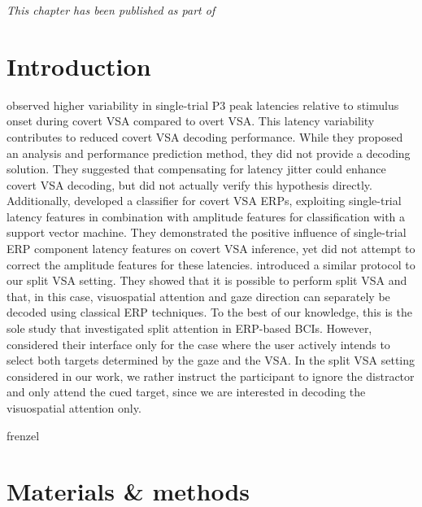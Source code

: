 \label{sec:covert-align}
\emph{This chapter has been published as part of~\textcite{VanDenKerchove2024}}

\section{Introduction}

\textcite{Arico2014} observed higher variability in single-trial P3 peak
latencies relative to stimulus onset during covert VSA compared to overt VSA.
This latency variability contributes to reduced covert VSA decoding performance.
While they proposed an analysis and performance prediction method, they did not provide a
decoding solution.
They suggested that compensating for latency jitter could enhance covert VSA
decoding, but did not actually verify this hypothesis directly.
Additionally, \cite{Hardiansyah2020} developed a classifier for
covert VSA ERPs, exploiting single-trial latency features in combination with
amplitude features for classification with a support vector machine.
They demonstrated the positive influence of single-trial ERP component latency
features on covert VSA inference, yet did not attempt to correct the amplitude
features for these latencies.
\textcite{Frenzel2011} introduced a similar protocol to our split VSA
setting.
They showed that it is possible to perform split VSA and that, in this
case, visuospatial attention and gaze direction can separately be decoded using
classical ERP techniques.
To the best of our
knowledge, this is the sole study that investigated split attention in ERP-based BCIs.
However, \textcite{Frenzel2011} considered their interface only for the case
where the user actively intends to select both targets determined by the gaze
and the VSA.
In the split VSA setting considered in our work, we rather instruct the participant to ignore
the distractor and only attend the cued target, since we are interested in
decoding the visuospatial attention only.

frenzel

\section{Materials \& methods}

